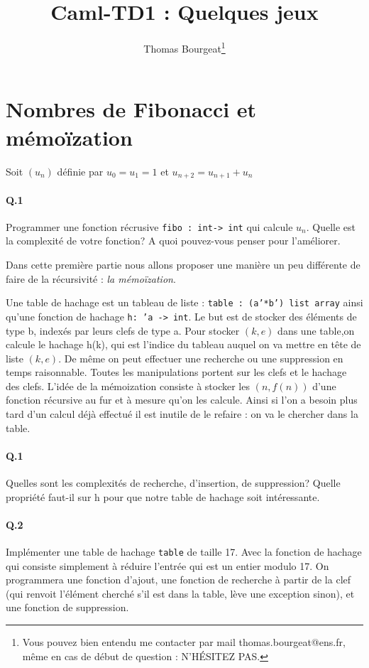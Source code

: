 \documentclass[10pt,a4paper]{article}
\begin{document}
\title{Caml-TD1 : Quelques jeux}
\author{Thomas Bourgeat\footnote{Vous pouvez bien entendu me contacter par mail thomas.bourgeat@ens.fr, même en cas de début de question : N'HÉSITEZ PAS.}}
\maketitle{}

\section{Nombres de Fibonacci et mémoïzation}
Soit $(u_n)$ définie par $u_0=u_1=1$ et $u_{n+2}=u_{n+1}+u_n$
\paragraph{Q.1} Programmer une fonction récrusive \texttt{fibo : int-> int} qui calcule $u_n$. Quelle est la complexité de votre fonction? A quoi pouvez-vous penser pour l'améliorer.

Dans cette première partie nous allons proposer une manière un peu différente de faire de la récursivité : \emph{la mémoïzation}.

Une table de hachage est un tableau de liste : \texttt{table : (a'*b')
list array} ainsi qu'une fonction de hachage \texttt{h: 'a -> int}. Le
but est de stocker des éléments de type b, indexés par leurs clefs de
type a. Pour stocker $(k,e)$ dans une table,on calcule le hachage h(k),
qui est l'indice du tableau auquel on va mettre en tête de liste $(k,e)$. De même on peut effectuer une recherche ou une suppression en temps raisonnable.
Toutes les manipulations portent sur les clefs et le hachage des clefs.
L'idée de la mémoization consiste à stocker les $(n,f(n))$ d'une fonction
récursive au fur et à mesure qu'on les calcule. Ainsi si l'on a besoin plus tard
d'un calcul déjà effectué il est inutile de le refaire  : on va le
chercher dans la table.


\paragraph{Q.1}Quelles sont les complexités de recherche, d'insertion, de
suppression? Quelle propriété faut-il sur h pour que notre table de
hachage soit intéressante.

\paragraph{Q.2} Implémenter une table de hachage \texttt{table} de taille
17. Avec la fonction de hachage qui consiste simplement à réduire
l'entrée qui est un entier modulo 17. On programmera une fonction
d'ajout, une fonction de recherche à partir de la clef (qui renvoit
l'élément cherché s'il est dans la table, lève une exception sinon),
et une fonction de suppression.
\end{document}
